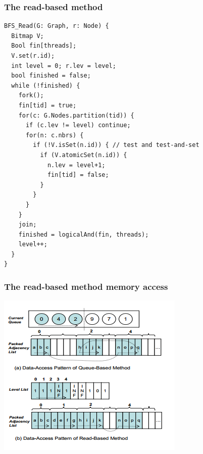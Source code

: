 \documentclass{beamer}
\begin{document}
\begin{frame}[fragile]
\frametitle{The read-based method}
\begin{lstlisting}
BFS_Read(G: Graph, r: Node) {
  Bitmap V;
  Bool fin[threads];
  V.set(r.id);
  int level = 0; r.lev = level;
  bool finished = false;
  while (!finished) {
    fork();
    fin[tid] = true;
    for(c: G.Nodes.partition(tid)) {
      if (c.lev != level) continue;
      for(n: c.nbrs) {
        if (!V.isSet(n.id)) { // test and test-and-set
          if (V.atomicSet(n.id)) {
            n.lev = level+1;
            fin[tid] = false;
          } 
        } 
      } 
    }
    join;
    finished = logicalAnd(fin, threads);
    level++;
  } 
}
\end{lstlisting}

\end{frame}
\begin{frame}
\frametitle{The read-based method memory access}

\includegraphics[scale=0.7]{memory.png}

\end{frame}
\end{document}
